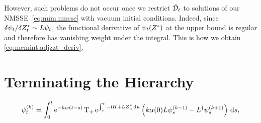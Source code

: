 However, such problems do not occur once we restrict $\dot{\mathcal{D}}_t$ to solutions of our NMSSE~\ref{eq:num.nmsse} with vacuum initial conditions.
Indeed, since $\delta\psit / \delta\ZZ_t \propto L\psit$, the functional derivative of $\psitZ$ at the upper bound is regular and therefore has vanishing weight under the integral.
This is how we obtain \autoref{eq:memint.adjzzt_deriv}.

\section{Terminating the Hierarchy}
\label{sec:hierarchy.terminator}

\begin{equation}
  \psit[k] = \int_0^t \exp[-kw(t-s)] \Texp[\int_s^t -\ii\Hsys + L\ZZ_u \dd u] \left( k \alpha(0)L\psi_s^{(k-1)} - \adj{L} \psi_s^{(k+1)} \right) \dd s,
  \label{eq:num.terminator_integral}
\end{equation}










